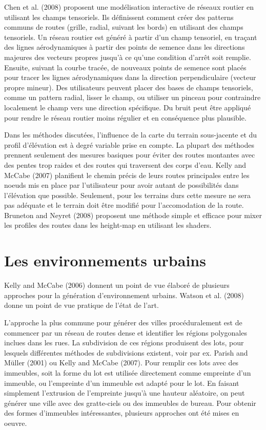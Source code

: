 \documentclass[11pt]{report}
\begin{document}
Chen et al. (2008) proposent une modélisation interactive de réseaux routier en utilisant les champs tensoriels. Ils définissent comment créer des patterns communs de routes (grille, radial, suivant les bords) en utilisant des champs tensoriels. Un réseau routier est généré à partir d'un champ tensoriel, en traçant des lignes aérodynamiques à partir des points de semence dans les directions majeures des vecteurs propres jusqu'à ce qu'une condition d'arrêt soit remplie. Ensuite, suivant la courbe tracée, de nouveaux points de semence sont placés pour tracer les lignes aérodynamiques dans la direction perpendiculaire (vecteur propre mineur). Des utilisateurs peuvent placer des bases de champs tensoriels, comme un pattern radial, lisser le champ, ou utiliser un pinceau pour contraindre localement le champ vers une direction spécifique. Du bruit peut être appliqué pour rendre le réseau routier moins régulier et en conséquence plus plausible. \newline

Dans les méthodes discutées, l'influence de la carte du terrain sous-jacente et du profil d'élévation est à degré variable prise en compte. La plupart des méthodes prennent seulement des mesures basiques pour éviter des routes montantes avec des pentes trop raides et des routes qui traversent des corps d'eau. Kelly and McCabe (2007) planifient le chemin précis de leurs routes principales entre les noeuds mis en place par l'utilisateur pour avoir autant de possibilités dans l'élévation que possible. Seulement, pour les terrains durs cette mesure ne sera pas adéquate et le terrain doit être modifié pour l'accomodation de la route. Bruneton and Neyret (2008) proposent une méthode simple et efficace pour mixer les profiles des routes dans les height-map en utilisant les shaders.

\section{Les environnements urbains}

Kelly and McCabe (2006) donnent un point de vue élaboré de plusieurs approches pour la génération d'environnement urbains. Watson et al. (2008) donne un point de vue pratique de l'état de l'art. \newline

L'approche la plus commune pour générer des villes procéduralement est de commencer par un réseau de routes dense et identifier les régions polygonales inclues dans les rues. La subdivision de ces régions produisent des lots, pour lesquels différentes méthodes de subdivisions existent, voir par ex. Parish and Müller (2001) ou Kelly and McCabe (2007). Pour remplir ces lots avec des immeubles, soit la forme du lot est utilisée directement comme empreinte d'un immeuble, ou l'empreinte d'un immeuble est adapté pour le lot. En faisant simplement l'extrusion de l'empreinte jusqu'à une hauteur aléatoire, on peut générer une ville avec des gratte-ciels ou des immeubles de bureau. Pour obtenir des formes d'immeubles intéressantes, plusieurs approches ont été mises en oeuvre.\newline
\end{document}
